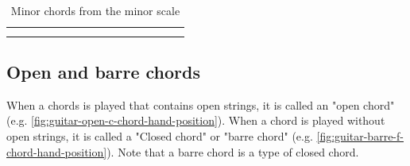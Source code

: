 \begin{table}[h]
\begin{minipage}{0.45\textwidth}
\begin{NiceTabular}{*{16}{P{0.05mm}}}
			 & &  & &  & &  & &  & &  & &  & &  \\
			 & &  & &  & &  & &  & &  & &  & &  \\
		\end{NiceTabular}
		\caption{Minor chords from the minor scale}
		\label{tab:guitar_minor_chords_from_scales}
	\end{minipage}
\end{table}

\newpage

\subsection{Open and barre chords}

When a chords is played that contains open strings, it is called an "open chord" (e.g. \autoref{fig:guitar-open-c-chord-hand-position}). When a chord is played without open strings, it is called a "Closed chord" or "barre chord" (e.g. \autoref{fig:guitar-barre-f-chord-hand-position}). Note that a barre chord is a type of closed chord.

